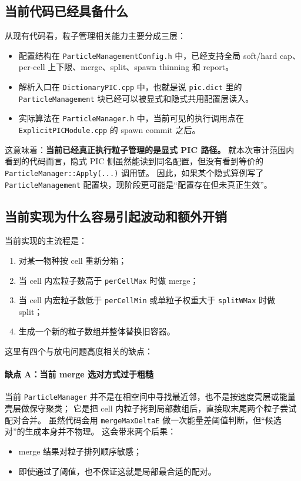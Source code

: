 \documentclass[UTF8,11pt,a4paper]{ctexart}
\begin{document}
\subsection{当前代码已经具备什么}
从现有代码看，粒子管理相关能力主要分成三层：
\begin{itemize}[itemsep=3pt]
  \item 配置结构在 \texttt{ParticleManagementConfig.h} 中，已经支持全局 soft/hard cap、per-cell 上下限、merge、split、spawn thinning 和 report。
  \item 解析入口在 \texttt{DictionaryPIC.cpp} 中，也就是说 \texttt{pic.dict} 里的 \texttt{ParticleManagement} 块已经可以被显式和隐式共用配置层读入。
  \item 实际算法在 \texttt{ParticleManager.h} 中，当前可见的执行调用点在 \texttt{ExplicitPICModule.cpp} 的 spawn commit 之后。
\end{itemize}

这意味着：\textbf{当前已经真正执行粒子管理的是显式 PIC 路径。}
就本次审计范围内看到的代码而言，隐式 PIC 侧虽然能读到同名配置，但没有看到等价的 \texttt{ParticleManager::Apply(...)} 调用链。
因此，如果某个隐式算例写了 \texttt{ParticleManagement} 配置块，现阶段更可能是“配置存在但未真正生效”。

\subsection{当前实现为什么容易引起波动和额外开销}

当前实现的主流程是：
\begin{enumerate}[itemsep=3pt]
  \item 对某一物种按 cell 重新分箱；
  \item 当 cell 内宏粒子数高于 \texttt{perCellMax} 时做 merge；
  \item 当 cell 内宏粒子数低于 \texttt{perCellMin} 或单粒子权重大于 \texttt{splitWMax} 时做 split；
  \item 生成一个新的粒子数组并整体替换旧容器。
\end{enumerate}

这里有四个与放电问题高度相关的缺点：

\paragraph{缺点 A：当前 merge 选对方式过于粗糙}
当前 \texttt{ParticleManager} 并不是在相空间中寻找最近邻，也不是按速度壳层或能量壳层做保守聚类；
它是把 cell 内粒子拷到局部数组后，直接取末尾两个粒子尝试配对合并。
虽然代码会用 \texttt{mergeMaxDeltaE} 做一次能量差阈值判断，但“候选对”的生成本身并不物理。
这会带来两个后果：
\begin{itemize}[itemsep=2pt]
  \item merge 结果对粒子排列顺序敏感；
  \item 即使通过了阈值，也不保证这就是局部最合适的配对。
\end{itemize}
\end{document}
